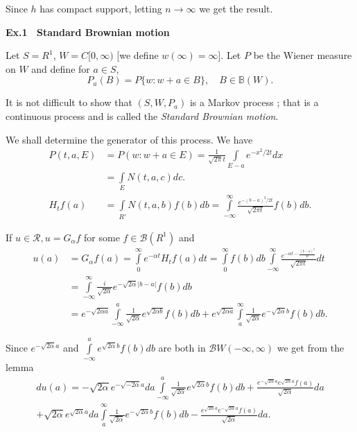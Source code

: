 Since $h$ has compact support, letting $n \to \infty$ we get the result. 

\medskip
\noindent
{\bf Ex.1~ Standard Brownian motion}
\smallskip

Let $S = R^1$, $W = C [ 0, \infty)$ [we define $w(\infty) =
    \infty$]. Let $P$ be the Wiener measure on $W$ and define for $a
  \in S$,   
$$
P_a (B) = P \{ w : w + a \in B\},\quad B \in \mathbb{B}(W). 
$$

It is not difficult to show that $(S, W, P_a )$ is a Markov process ;
that is a continuous process and is called the \textit{Standard
  Brownian motion}. 

We shall determine the generator of this process. We have 
\begin{align*}
  P(t, a, E) & = P (w: w + a \in E)= \frac{1}{\sqrt{2 \pi} t} 
\int\limits_{E - a} e^{ - x^2/2t} dx\\  
  & = \int\limits _{E}  N(t, a, c) dc . \\
  H_t f(a) & =\int\limits_{R'} N(t, a, b) f(b) db =
  \int\limits^{\infty}_{-\infty}\frac{e^{ - (b - a)^2 / 2t}}{\sqrt{ 2
    \pi t}} f (b)db.  
\end{align*}\pageoriginale

If $u \in \mathscr{R}, u = G_\alpha f $ for some $f \in \mathscr{B}(R^1)$ and 
\begin{align*}
u(a) & = G_\alpha f (a)  = \int\limits^\infty_0 e^{- \alpha t}H_t
  f (a) dt = \int\limits^\infty_0  f(b) db  \int\limits^\infty_{-\infty}
  \frac{e^{- \alpha t - \frac{(b- a)^2}{2t}}}{ \sqrt{ 2 \pi t}} dt
  \\ 
  &  = \int\limits^\infty _{- \infty} \frac {i}{\sqrt{2 \alpha }}e^{-
    \sqrt{ 2 \alpha}|b - a|} f (b) db \\ 
  & = e^{ - \sqrt{2 \alpha a }} \int\limits^a _{ -\infty }
  \frac{1}{\sqrt{ 2 \alpha} }  e^{ \sqrt {2 \alpha b}} f(b)db + e ^{
    \sqrt{2 \alpha a}} \int\limits^\infty_{a} \frac{1}{\sqrt{2\alpha}}e
  ^{ - \sqrt{ 2 \alpha} b}  f (b)db.  
\end{align*}

Since $e^{- \sqrt{2 \alpha} a}$ and $\int\limits^a_{- \infty}e^{\sqrt{2\alpha}b} f
(b)db$ are both in $\mathscr{B} W (- \infty, \infty )$ we get from the
lemma 
\begin{multline*}
du (a) = - \sqrt{ 2 \alpha }e^{ -\sqrt{ -2 \alpha} a} da
\int\limits^a_{- \infty} \frac{1}{\sqrt{2 \alpha}} e^{\sqrt{2 \alpha} b} f(b) db + \frac{e^{-\sqrt{2 \alpha} a} e ^{\sqrt{2\alpha} a} f(a)}{\sqrt{2 \alpha }}da\\ 
+ \sqrt{2 \alpha} e^{\sqrt{2 \alpha} a} da \int\limits^\infty_a  \frac{1}{\sqrt{ 2
    \alpha}}e^{- \sqrt{2 \alpha} b} f (b)db - \frac{e^{\sqrt{ 2 \alpha}
      a }e^{- \sqrt{2 \alpha} a} f (a)}{\sqrt{2 \alpha}} da. 
\end{multline*}

